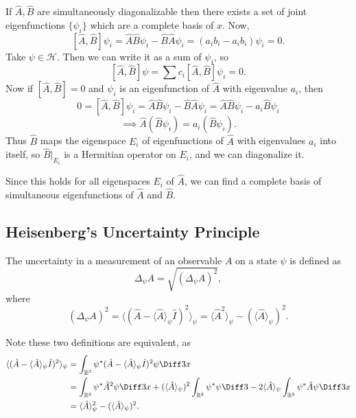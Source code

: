 \documentclass[12pt]{article}
\begin{document}
\begin{proofbox}
	If $\hat A, \hat B$ are simultaneously diagonalizable then there exists a set of joint eigenfunctions $\{\psi_i\}$ which are a complete basis of $x$. Now,
	\[
		[\hat A, \hat B] \psi_i = \hat A \hat B \psi_i - \hat B \hat A \psi_i = (a_i b_i - a_i b_i)\psi_i = 0
	.\]
	Take $\psi \in \mathcal{H}$. Then we can write it as a sum of $\psi_i$, so
	\[
		[\hat A, \hat B] \psi = \sum c_i [\hat A, \hat B] \psi_i = 0
	.\]
	Now if $[\hat A, \hat B] = 0$ and $\psi_i$ is an eigenfunction of $\hat A$ with eigenvalue $a_i$, then
	\[
		0 = [\hat A, \hat B] \psi_i = \hat A \hat B \psi_i - \hat B \hat A \psi_i = \hat A \hat B \psi_i - a_i \hat B \psi_i
	\]
	\[
		\implies \hat A (\hat B \psi_i) = a_i (\hat B \psi_i)
	.\]
	Thus $\hat B$ maps the eigenspace $E_i$ of eigenfunctions of $\hat A$ with eigenvalues $a_i$ into itself, so $\hat B|_{E_i}$ is a Hermitian operator on $E_i$, and we can diagonalize it.

	Since this holds for all eigenspaces $E_i$ of $\hat A$, we can find a complete basis of simultaneous eigenfunctions of $\hat A$ and $\hat B$.
\end{proofbox}

\subsection{Heisenberg's Uncertainty Principle}%
\label{sub:heisenberg_s_uncertainty_principle}

\begin{definition}
	The uncertainty in a measurement of an observable $A$ on a state $\psi$ is defined as
	\[
		\Delta_{\psi}A = \sqrt{(\Delta_{\psi}A)^2}
	,\]
	where
	\[
		(\Delta_{\psi}A)^2 = \langle (\hat A - \langle \hat A \rangle_{\psi} \hat I)^2 \rangle_{\psi} = \langle \hat A^2 \rangle_{\psi} - (\langle \hat A \rangle_{\psi})^2
	.\]
\end{definition}

Note these two definitions are equivalent, as
\begin{align*}
	\langle( \hat A - \langle \hat A \rangle_{\psi} \hat I)^2 \rangle_{\psi} &= \int_{\mathbb{R}^3} \psi^{\ast} (\hat A - \langle \hat A \rangle_{\psi}\hat I)^2 \psi \Diff3 x \\
										 &= \int_{\mathbb{R}^3} \psi^{\ast} \hat A^2 \psi \Diff3x + (\langle \hat A \rangle_{\psi})^2 \int_{\mathbb{R}^3} \psi^{\ast}\psi \Diff3 - 2 \langle \hat A \rangle_{\psi} \int_{\mathbb{R}^3} \psi^{\ast} \hat A \psi \Diff3 x \\
										 &= \langle \hat A \rangle^2_{\psi} - (\langle \hat A \rangle_{\psi})^2.
\end{align*}
\end{document}
